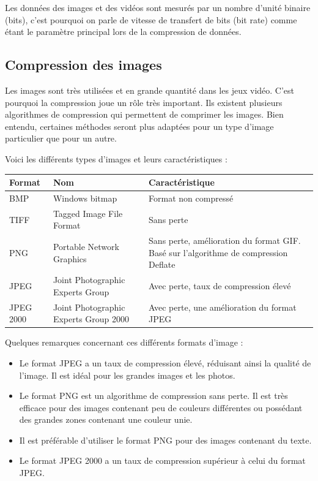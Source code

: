 \documentclass[a4paper, 11pt]{article} %
\begin{document}
Les données des images et des vidéos sont mesurés par un nombre d'unité binaire (bits), c'est pourquoi on parle de vitesse de transfert de bits (bit rate) comme étant le paramètre principal lors de la compression de données. 

\newpage
\subsection*{Compression des images}
Les images sont très utilisées et en grande quantité dans les jeux vidéo. C'est pourquoi la compression joue un rôle très important. Ils existent plusieurs algorithmes de compression qui permettent de comprimer les images. Bien entendu, certaines méthodes seront plus adaptées pour un type d'image particulier que pour un autre. 

Voici les différents types d'images et leurs caractéristiques : 

\begin{tabular}{|p{}|p{}|p{}|}
  \hline
  Format & Nom & Caractéristique\\\hline\hline
  BMP&Windows bitmap&Format non compressé\\\hline
	TIFF&Tagged Image File Format&Sans perte\\\hline
	PNG&Portable Network Graphics&Sans perte, amélioration du format GIF. Basé sur l'algorithme de compression Deflate\\\hline
	JPEG&Joint Photographic Experts Group&Avec perte, taux de compression élevé\\\hline
	JPEG 2000&Joint Photographic Experts Group 2000&Avec perte, une amélioration du format JPEG\\\hline
\end{tabular}

Quelques remarques concernant ces différents formats d'image : 

\begin{itemize}
  \item Le format JPEG a un taux de compression élevé, réduisant ainsi la qualité de l'image. Il est idéal pour les grandes images et les photos.
	\item Le format PNG est un algorithme de compression sans perte. Il est très efficace pour des images contenant peu de couleurs différentes ou possédant des grandes zones contenant une couleur unie.
	\item Il est préférable d'utiliser le format PNG pour des images contenant du texte.
	\item Le format JPEG 2000 a un taux de compression supérieur à celui du format JPEG.
\end{itemize}
\end{document}
